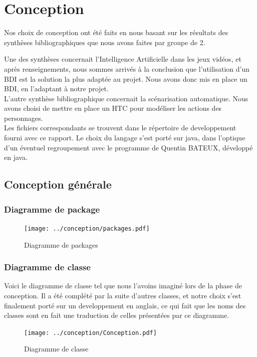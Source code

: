 \documentclass[asi]{picINSA}
\begin{document}
\chapter{Conception}
Nos choix de conception ont été faits en nous basant sur les résultats des synthèses bibliographiques que nous avons faites par groupe de 2. \newline

Une des synthèses concernait l'Intelligence Artificielle dans les jeux vidéos, et après renseignements, nous sommes arrivés à la conclusion que l'utilisation d'un BDI est la solution la plus adaptée au projet. Nous avons donc mis en place un BDI, en l'adaptant à notre projet. \\

L'autre synthèse bibliographique concernait la scénarisation automatique. Nous avons choisi de mettre en place un HTC pour modéliser les actions des personnages. \\

Les fichiers correspondants se trouvent dans le répertoire de developpement fourni avec ce rapport. Le choix du langage s'est porté sur java, dans l'optique d'un éventuel regroupement avec le programme de Quentin BATEUX, développé en java. 


\section{Conception générale}

\subsection{Diagramme de package}
\begin{figure}[!ht]
  \begin{center}
    \texttt{[image: ../conception/packages.pdf]}
    \caption{Diagramme de packages}	
  \end{center}
\end{figure}

\newpage

\subsection{Diagramme de classe}
Voici le diagramme de classe tel que nous l'avoins imaginé lors de la phase de conception. Il a été complété par la suite d'autres classes, et notre choix s'est finalement porté sur un developpement en anglais, ce qui fait que les noms des classes sont en fait une traduction de celles présentées par ce diagramme.
\begin{figure}[!ht]
  \begin{center}
    \texttt{[image: ../conception/Conception.pdf]}
    \caption{Diagramme de classe}	
  \end{center}
\end{figure}
\end{document}
